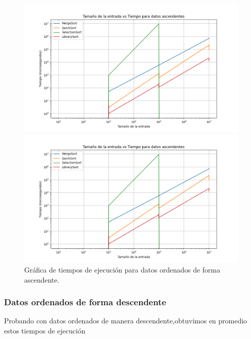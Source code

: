\begin{figure}[H]
    \centering
    \begin{minipage}[t]{0.5\textwidth}
        \includegraphics[width=\textwidth]{../code/sorting/data/plots/ascendente_plot.png}
    \end{minipage}%
    \begin{minipage}[t]{0.5\textwidth}
        \includegraphics[width=\textwidth]{../code/sorting/data/plots/ascendente_plot.png}
     \end{minipage}%
    \caption{Gráfica de tiempos de ejecución para datos ordenados de forma ascendente.}
    \label{fig:ordenadas_ascendente}
\end{figure}

\newpage

\subsubsection*{Datos ordenados de forma descendente}

Probando con datos ordenados de manera descendente,obtuvimos en promedio estos tiempos de ejecución


